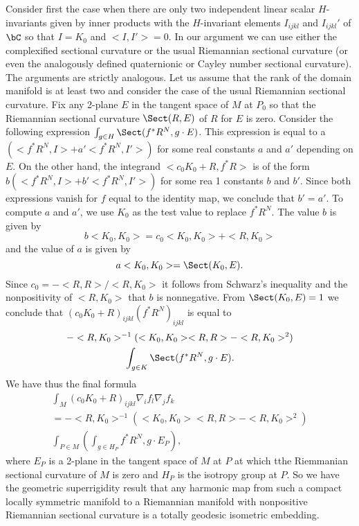 Consider first the case when there are only two independent linear scalar $H$-invariants given by inner products with the $H$-invariant elements $I_{ijkl}$ and $I_{ijkl}'$ of $\bC$ so that $I =K_{0}$ and $ < I, I' > =0$. In our argument we can use either the complexified sectional curvature or the usual Riemannian sectional curvature (or even the analogously defined quaternionic or Cayley number sectional curvature). The arguments are strictly analogous. Let us assume that the rank of the domain manifold is at least two and consider the case of the usual Riemannian sectional curvature. Fix any 2-plane $E$ in the tangent space of $M$ at $P_{0}$ so that the Riemannian sectional curvature $\Sect(R, E)$ of $R$ for $E$ is zero. Consider the following expression $\int_{g \in H} \Sect(f^{*}R^{N}, g \cdot E)$. This expression is equal to a
$\left(< f^{*}R^{N}, I > + a'  < f^{*}R^{N}, I' >\right)$ for some real constants $a$ and $a'$ depending on $E$. On the other hand, the integrand $< c_{0}K_{0} + R, f^{*}R >$ is of the form $b\left(< f^{*}R^{N}, I > + b' < f^{*}R^{N}, I' >\right)$ for some rea 1 constants $b$ and $b'$. Since both expressions vanish for $f$ equal to the identity map, we conclude that $b' =a'$. To compute $a$ and $a'$,  we use $K_{0}$ as the test value to replace $f^{*}R^{N}$. The value $b$ is given by
$$
b < K_{0}, K_{0} > =c_{0}< K_{0}, K_{0} > + < R, K_{0} >
$$
and the value of $a$ is given by
$$
a < K_{0}, K_{0} > = \Sect(K_{0}, E).
$$
Since $c_{0}=-<R, R>/<R, K_{0}>$ it follows from Schwarz's inequality and the nonpositivity of $< R, K_{0}>$ that $b$ is nonnegative. From $\Sect(K_{0}, E) = 1$ we conclude that $(c_{0}K_{0} + R)_{ijkl}(f^{*}R^{N})_{ijkl}$ is equal to
\begin{equation*}
\begin{split}
&-< R, K_{0}>^{-1} (< K_{0}, K_{0}><R, R>-< R, K_{0}>^{2})\\
&\qquad \qquad \qquad \int_{g \in K} \Sect(f^{*}R^{N}, g\cdot E).
\end{split}
\end{equation*}
We have thus the final formula
\begin{gather*}
\int_{M}(c_{0}K_{0}+ R)_{ijkl}\nabla_{i}f_{l}\nabla_{j}f_{k}\\
=-< R, K_{0}>^{-1}(<K_{0}, K_{0}><R, R>-<R, K_{0}>^{2})\\
\int_{P \in M}\left( \int_{g \in H_{P}} f^{*}R^{N}, g \cdot E_{P}\right),
\end{gather*}
where $E_{P}$ is a 2-plane in the tangent space of $M$ at $P$ at which tthe Riemmanian sectional curvature of $M$ is zero and $H_{P}$ is the isotropy group at $P$. So we have the geometric superrigidity result that  any harmonic map from such a compact locally symmetric manifold to a Riemannian manifold with nonpositive Riemannian sectional curvature is a totally geodesic isometric embedding.

